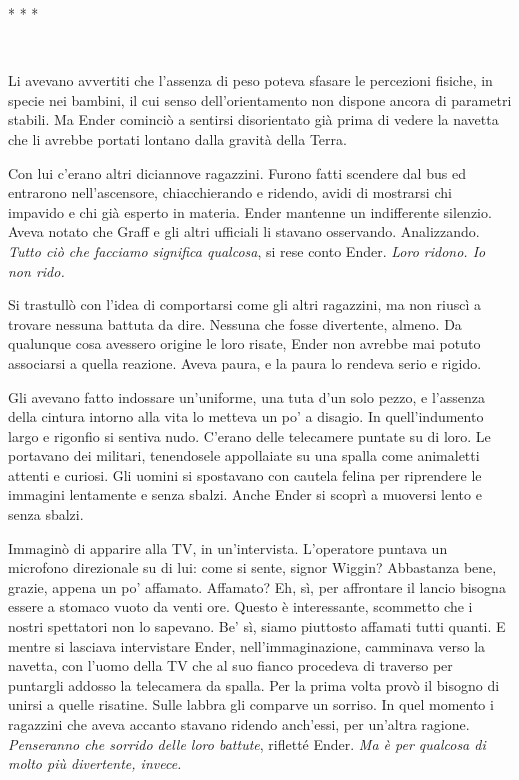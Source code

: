 \begin{center}
	{* * *}
\end{center}

{~}

{Li avevano avvertiti che l'assenza di peso poteva sfasare le percezioni
	fisiche, in specie nei bambini, il cui senso dell'orientamento non
	dispone ancora di parametri stabili. Ma Ender cominciò a sentirsi
	disorientato già prima di vedere la navetta che li avrebbe portati
	lontano dalla gravità della Terra.}

{Con lui c'erano altri diciannove ragazzini. Furono fatti scendere dal
	bus ed entrarono nell'ascensore, chiacchierando e ridendo, avidi di
	mostrarsi chi impavido e chi già esperto in materia. Ender mantenne un
	indifferente silenzio. Aveva notato che Graff e gli altri ufficiali li
	stavano osservando. Analizzando. \emph{Tutto ciò che facciamo significa
		qualcosa}, \emph{} si rese conto Ender. \emph{Loro ridono. Io non
		rido.}}

{Si trastullò con l'idea di comportarsi come gli altri ragazzini, ma non
	riuscì a trovare nessuna battuta da dire. Nessuna che fosse divertente,
	almeno. Da qualunque cosa avessero origine le loro risate, Ender non
	avrebbe mai potuto associarsi a quella reazione. Aveva paura, e la paura
	lo rendeva serio e rigido.}

{Gli avevano fatto indossare un'uniforme, una tuta d'un solo pezzo, e
	l'assenza della cintura intorno alla vita lo metteva un po' a disagio.
	In quell'indumento largo e rigonfio si sentiva nudo. C'erano delle
	telecamere puntate su di loro. Le portavano dei militari, tenendosele
	appollaiate su una spalla come animaletti attenti e curiosi. Gli uomini
	si spostavano con cautela felina per riprendere le immagini lentamente e
	senza sbalzi. Anche Ender si scoprì a muoversi lento e senza sbalzi.}

{Immaginò di apparire alla TV, in un'intervista. L'operatore puntava un
	microfono direzionale su di lui: come si sente, signor Wiggin?
	Abbastanza bene, grazie, appena un po' affamato. Affamato? Eh, sì, per
	affrontare il lancio bisogna essere a stomaco vuoto da venti ore. Questo
	è interessante, scommetto che i nostri spettatori non lo sapevano. Be'
	sì, siamo piuttosto affamati tutti quanti. E mentre si lasciava
	intervistare Ender, nell'immaginazione, camminava verso la navetta, con
	l'uomo della TV che al suo fianco procedeva di traverso per puntargli
	addosso la telecamera da spalla. Per la prima volta provò il bisogno di
	unirsi a quelle risatine. Sulle labbra gli comparve un sorriso. In quel
	momento i ragazzini che aveva accanto stavano ridendo anch'essi, per
	un'altra ragione. \emph{Penseranno che sorrido delle loro battute},
	\emph{} rifletté Ender. \emph{Ma è per qualcosa di molto più divertente,
		invece.}}

